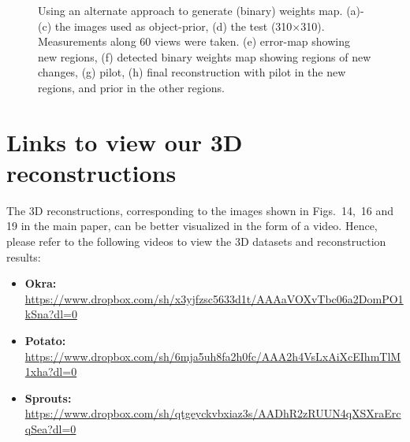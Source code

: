 \documentclass{article}
\begin{document}
\begin{figure}[!h]
\begin{subfigure}[b]{0.31\linewidth}
        \caption{}
     \end{subfigure}

     \caption[Selecting $k$]{Using an alternate approach to generate (binary) weights map. (a)-(c) the images used as object-prior, (d) the test (310$\times$310). Measurements along $60$ views were taken. (e) error-map showing new regions, (f) detected binary weights map showing regions of new changes, (g) pilot, (h) final reconstruction with pilot in the new regions, and prior in the other regions. } %
\label{fig:okra_svm}
\end{figure}
\clearpage
\newpage
\section{Links to view our 3D reconstructions}
The 3D reconstructions, corresponding to the images shown in Figs.~14,~16 and 19 in the main paper, can be better visualized in the form of a video. Hence, please refer to the following videos to view the 3D datasets and reconstruction results:

\begin{itemize}
\item \textbf{Okra:} \\

  \url{https://www.dropbox.com/sh/x3yjfzsc5633d1t/AAAaVOXvTbc06a2DomPO1kSna?dl=0}\\
\item \textbf{Potato:} \\

  \url{https://www.dropbox.com/sh/6mja5uh8fa2h0fc/AAA2h4VsLxAiXcEIhmTlM1xha?dl=0}\\
\item \textbf{Sprouts:}\\

  \url{https://www.dropbox.com/sh/qtgeyckvbxiaz3s/AADhR2zRUUN4qXSXraErcqSea?dl=0}\\
\end{itemize}

\newpage

\end{document}
